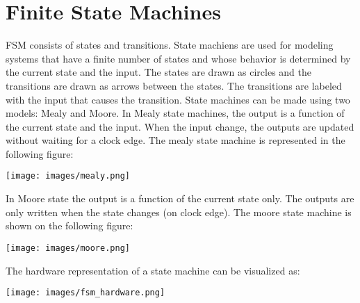 \section{Finite State Machines}

FSM consists of states and transitions.
State machiens are used for modeling systems that have a finite number
of states and whose behavior is determined by the current state and
the input. The states are drawn as circles and the transitions are
drawn as arrows between the states. The transitions are labeled with
the input that causes the transition.
State machines can be made using two models: Mealy and Moore. In
Mealy state machines, the output
is a function of the current state and the input.
When the input change, the outputs are updated without waiting for a clock
edge. The mealy state machine is represented in the following figure:

\begin{center}
	\texttt{[image: images/mealy.png]}
\end{center}

In Moore state the output is a function of the current state only.
The outputs are only written when the state changes (on clock edge).
The moore state machine is shown on the following figure:

\begin{center}
	\texttt{[image: images/moore.png]}
\end{center}


The hardware representation of a state machine can be visualized as:

\begin{center}
	\texttt{[image: images/fsm\_hardware.png]}
\end{center}

